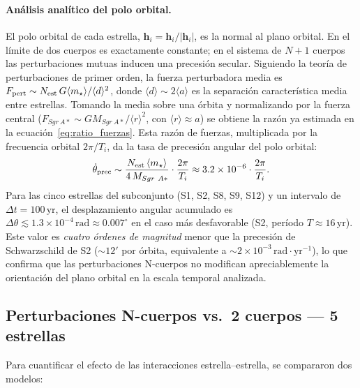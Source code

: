 \documentclass[12pt,a4paper]{article}
\newcommand{\SgrA}{Sgr~A*}
\newcommand{\yr}{\text{yr}}
\begin{document}
\paragraph{Análisis analítico del polo orbital.}
El polo orbital de cada estrella, $\hat{\mathbf{h}}_i = \mathbf{h}_i/|\mathbf{h}_i|$, es la normal al plano
orbital.  En el límite de dos cuerpos es exactamente constante; en el sistema de $N+1$ cuerpos las
perturbaciones mutuas inducen una precesión secular.  Siguiendo la teoría de perturbaciones de primer
orden, la fuerza perturbadora media es $F_{\rm pert} \sim N_{\rm est}\,G\langle m_\star\rangle/\langle d\rangle^2$,
donde $\langle d\rangle \sim 2\langle a \rangle$ es la separación característica media entre estrellas.
Tomando la media sobre una órbita y normalizando por la fuerza central
($F_{\SgrA} \sim G M_{\SgrA}/\langle r\rangle^2$, con $\langle r\rangle \approx a$) se obtiene la
razón ya estimada en la ecuación~\eqref{eq:ratio_fuerzas}.  Esta razón de fuerzas, multiplicada
por la frecuencia orbital $2\pi/T_i$, da la tasa de precesión angular del polo orbital:
\begin{equation}
  \dot{\theta}_{\rm prec} \sim
    \frac{N_{\rm est}\,\langle m_\star \rangle}{4\,M_{\SgrA}}
    \cdot \frac{2\pi}{T_i}
  \approx 3.2\times10^{-6} \cdot \frac{2\pi}{T_i}.
  \label{eq:prec_polo}
\end{equation}
Para las cinco estrellas del subconjunto (S1, S2, S8, S9, S12) y un intervalo de
$\Delta t = 100\,\yr$, el desplazamiento angular acumulado es
$\Delta\theta \lesssim 1.3\times10^{-4}\,\text{rad} \approx 0.007^\circ$ en el caso más desfavorable
(S2, período $T \approx 16\,\yr$).  Este valor es \emph{cuatro órdenes de magnitud} menor que la
precesión de Schwarzschild de S2 ($\sim 12'$ por órbita, equivalente a
$\sim 2\times10^{-3}\,\text{rad}\cdot\text{yr}^{-1}$), lo que confirma que las perturbaciones N-cuerpos
no modifican apreciablemente la orientación del plano orbital en la escala temporal analizada.

\subsection{Perturbaciones N-cuerpos vs.\ 2 cuerpos — 5 estrellas}
\label{subsec:perturbaciones_5}

Para cuantificar el efecto de las interacciones estrella--estrella, se compararon
dos modelos:
\end{document}
